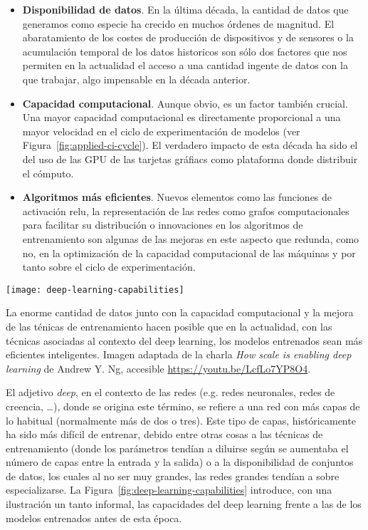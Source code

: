\begin{itemize}
	\item \textbf{Disponibilidad de datos}. En la última década, la cantidad de datos que generamos como especie ha crecido en muchos órdenes de magnitud. El abaratamiento de los costes de producción de dispositivos y de sensores o la acumulación temporal de los datos historicos son sólo dos factores que nos permiten en la actualidad el acceso a una cantidad ingente de datos con la que trabajar, algo impensable en la década anterior.
	\item \textbf{Capacidad computacional}. Aunque obvio, es un factor también crucial. Una mayor capacidad computacional es directamente proporcional a una mayor velocidad en el ciclo de experimentación de modelos (ver Figura~\ref{fig:applied-ci-cycle}). El verdadero impacto de esta década ha sido el del uso de las GPU de las tarjetas gráfiacs como plataforma donde distribuir el cómputo.
	\item \textbf{Algoritmos más eficientes}. Nuevos elementos como las funciones de activación \gls{relu}, la representación de las redes como grafos computacionales para facilitar su distribución o innovaciones en los algoritmos de entrenamiento son algunas de las mejoras en este aspecto que redunda, como no, en la optimización de la capacidad computacional de las máquinas y por tanto sobre el ciclo de experimentación.
\end{itemize}

\begin{marginfigure}
	\texttt{[image: deep-learning-capabilities]}
	\caption[Capacidad de los modelos en función de la cantidad de datos]{La enorme cantidad de datos junto con la capacidad computacional y la mejora de las ténicas de entrenamiento hacen posible que en la actualidad, con las técnicas asociadas al contexto del deep learning, los modelos entrenados sean más eficientes  inteligentes. Imagen adaptada de la charla \textit{How scale is enabling deep learning} de Andrew Y. Ng, accesible \url{https://youtu.be/LcfLo7YP8O4}.}
	\label{fig:deep-learning-capabilities}
\end{marginfigure}

El adjetivo \textit{deep}, en el contexto de las redes (e.g. redes neuronales, redes de creencia, \ldots), donde se origina este término, se refiere a una red con más capas de lo habitual (normalmente más de dos o tres). Este tipo de capas, históricamente ha sido más difícil de entrenar, debido entre otras cosas a las técnicas de entrenamiento (donde los parámetros tendían a diluirse según se aumentaba el número de capas entre la entrada y la salida) o a la disponibilidad de conjuntos de datos, los cuales al no ser muy grandes, las redes grandes tendían a sobre especializarse. La Figura~\ref{fig:deep-learning-capabilities} introduce, con una ilustración un tanto informal, las capacidades del deep learning frente a las de los modelos entrenados antes de esta época.

